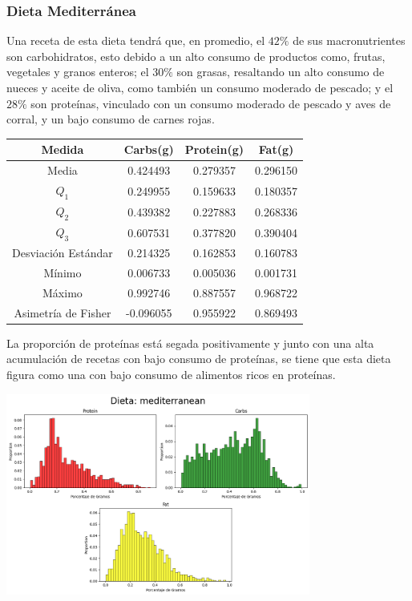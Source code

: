 \documentclass[12pt,a4paper]{article}
\begin{document}
    \subsubsection{Dieta Mediterránea}
        Una receta de esta dieta tendrá que, en promedio, el $42\%$ de sus 
        macronutrientes son carbohidratos, esto debido a un alto consumo de 
        productos como, frutas, vegetales y granos enteros; el $30\%$ son 
        grasas, resaltando un alto consumo de nueces y aceite de oliva, como 
        también un consumo moderado de pescado; y el $28\%$ son proteínas, 
        vinculado con un consumo moderado de pescado y aves de corral, y un 
        bajo consumo de carnes rojas. 
        \begin{center}
            \begin{tabular}{|c|ccc|}
                \hline
                Medida & Carbs(g) & Protein(g) & Fat(g) \\
                \hline
                Media               & 0.424493 & 0.279357 & 0.296150  \\
                $Q_1$               & 0.249955 & 0.159633 & 0.180357  \\
                $Q_2$               & 0.439382 & 0.227883 & 0.268336  \\
                $Q_3$               & 0.607531 & 0.377820 & 0.390404  \\
                Desviación Estándar & 0.214325 & 0.162853 & 0.160783  \\
                Mínimo              & 0.006733 & 0.005036 & 0.001731  \\
                Máximo              & 0.992746 & 0.887557 & 0.968722  \\
                Asimetría de Fisher & -0.096055 & 0.955922 & 0.869493 \\
                \hline
            \end{tabular}
        \end{center}
        La proporción de proteínas está segada positivamente y junto con una 
        alta acumulación de recetas con bajo consumo de proteínas, se tiene que 
        esta dieta figura como una con bajo consumo de alimentos ricos en proteínas. 
        \begin{center}
            \includegraphics[width=0.75\textwidth]{Resources/2_03_plot_03.png}
        \end{center}
\end{document}
